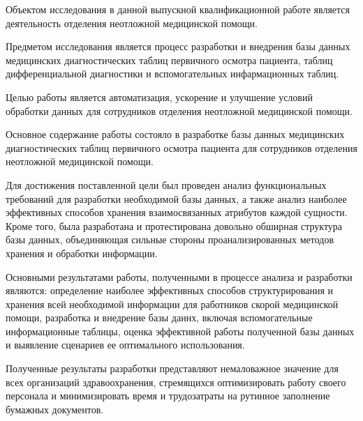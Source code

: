 \abstract %


Объектом исследования в данной выпускной квалификационной работе является деятельность отделения неотложной медицинской помощи.

Предметом исследования является процесс разработки и внедрения базы данных медицинских диагностических таблиц первичного осмотра пациента, таблиц дифференциальной диагностики и вспомогательных инфармационных таблиц.

Целью работы является автоматизация, ускорение и улучшение условий обработки данных для сотрудников отделения неотложной медицинской помощи.

Основное содержание работы состояло в разработке базы данных медицинских диагностических таблиц первичного осмотра пациента для сотрудников отделения неотложной медицинской помощи.

Для достижения поставленной цели был проведен анализ функциональных требований для разработки необходимой базы данных, а также анализ наиболее эффективных способов хранения взаимосвязанных атрибутов каждой сущности. Кроме того, была разработана и протестирована довольно обширная структура базы данных, объединяющая сильные стороны проанализированных методов хранения и обработки информации.

Основными результатами работы, полученными в процессе анализа и разработки являются: определение наиболее эффективных способов структурирования и хранения всей необходимой информации для работников скорой медицинской помощи, разработка и внедрение базы даннх, включая вспомогательные информационные таблицы, оценка эффективной работы полученной базы данных и выявление сценариев ее оптимального использования.

Полученные результаты разработки представляют немаловажное значение для всех организаций здравоохранения, стремящихся оптимизировать работу своего персонала и минимизировать время и трудозатраты на рутинное заполнение бумажных документов.
